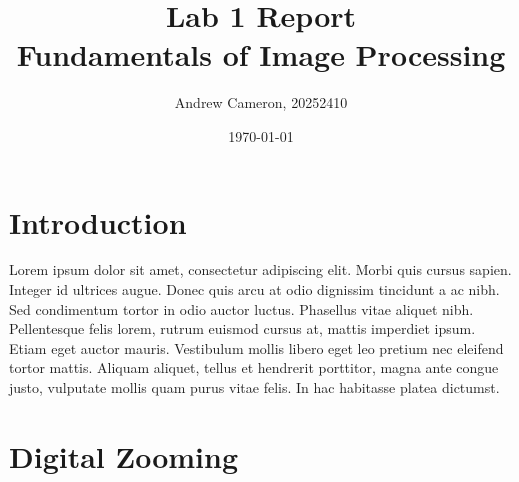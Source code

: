 \documentclass{sydeStyle}
\title{Lab 1 Report\\
Fundamentals of Image Processing}
\date{\today}
\author{Andrew Cameron, 20252410}
\begin{document}
\maketitle

\section*{Introduction}
Lorem ipsum dolor sit amet, consectetur adipiscing elit. Morbi quis cursus
sapien. Integer id ultrices augue. Donec quis arcu at odio dignissim
tincidunt a ac nibh. Sed condimentum tortor in odio auctor luctus.
Phasellus vitae aliquet nibh. Pellentesque felis lorem, rutrum euismod
cursus at, mattis imperdiet ipsum. Etiam eget auctor mauris. Vestibulum
mollis libero eget leo pretium nec eleifend tortor mattis. Aliquam aliquet,
tellus et hendrerit porttitor, magna ante congue justo, vulputate mollis
quam purus vitae felis. In hac habitasse platea dictumst.

\section*{Digital Zooming}




\end{document}
